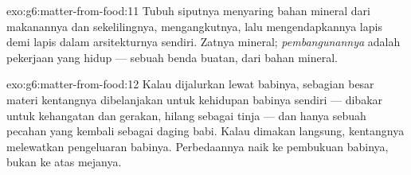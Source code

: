 \begin{solution}{exo:g6:matter-from-food:11}
Tubuh siputnya menyaring bahan mineral  dari makanannya dan
sekelilingnya, mengangkutnya, lalu mengendapkannya lapis demi lapis
dalam arsitekturnya sendiri. Zatnya mineral; \emph{pembangunannya}
adalah pekerjaan  yang hidup --- sebuah benda buatan, dari bahan
mineral.
\end{solution}

\begin{solution}{exo:g6:matter-from-food:12}
Kalau dijalurkan lewat babinya, sebagian besar materi kentangnya
dibelanjakan untuk kehidupan babinya sendiri --- dibakar untuk
kehangatan dan gerakan, hilang sebagai tinja --- dan hanya sebuah
pecahan yang kembali sebagai daging babi. Kalau dimakan langsung,
kentangnya melewatkan pengeluaran babinya. Perbedaannya naik ke
pembukuan babinya, bukan ke atas mejanya.
\end{solution}

